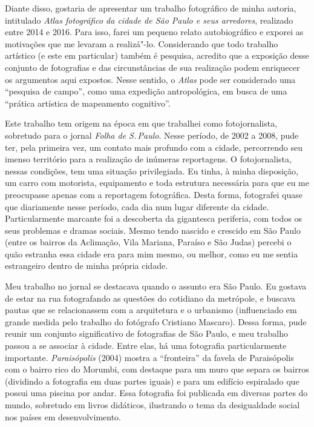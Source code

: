 Diante disso, gostaria de apresentar um trabalho fotográfico de minha
autoria, intitulado \emph{Atlas fotográfico da cidade de São Paulo e
seus arredores}, realizado entre 2014 e 2016. Para isso, farei um
pequeno relato autobiográfico e exporei as motivações que me levaram a
realizá"-lo. Considerando que todo trabalho artístico (e este em
particular) também é pesquisa, acredito que a exposição desse conjunto
de fotografias e das circunstâncias de sua realização podem enriquecer
os argumentos aqui expostos. Nesse sentido, o \emph{Atlas} pode ser
considerado uma ``pesquisa de campo'', como uma expedição antropológica,
em busca de uma ``prática artística de mapeamento cognitivo''.

Este trabalho tem origem na época em que trabalhei como fotojornalista,
sobretudo para o jornal \emph{Folha de S.\,Paulo}. Nesse período, de 2002
a 2008, pude ter, pela primeira vez, um contato mais profundo com a
cidade, percorrendo seu imenso território para a realização de inúmeras
reportagens. O fotojornalista, nessas condições, tem uma situação
privilegiada. Eu tinha, à minha disposição, um carro com motorista,
equipamento e toda estrutura necessária para que eu me preocupasse
apenas com a reportagem fotográfica. Desta forma, fotografei quase que
diariamente nesse período, cada dia num lugar diferente da cidade.
Particularmente marcante foi a descoberta da gigantesca periferia, com todos os seus problemas e dramas sociais. Mesmo tendo
nascido e crescido em São Paulo (entre os bairros da Aclimação, Vila
Mariana, Paraíso e São Judas) percebi o quão estranha essa cidade era
para mim mesmo, ou melhor, como eu me sentia estrangeiro dentro de minha
própria cidade.

Meu trabalho no jornal se destacava quando o assunto era São Paulo. Eu
gostava de estar na rua fotografando as questões do cotidiano da
metrópole, e buscava pautas que se relacionassem com a arquitetura e o
urbanismo (influenciado em grande medida pelo trabalho do fotógrafo
Cristiano Mascaro). Dessa forma, pude reunir um conjunto significativo
de fotografias de São Paulo, e meu trabalho passou a se associar à
cidade. Entre elas, há uma fotografia particularmente importante.
\emph{Paraisópolis} (2004) mostra a ``fronteira'' da favela de
Paraisópolis com o bairro rico do Morumbi, com destaque para um muro que
separa os bairros (dividindo a fotografia em duas partes iguais) e para
um edifício espiralado que possui uma piscina por andar. Essa fotografia
foi publicada em diversas partes do mundo, sobretudo em livros
didáticos, ilustrando o tema da desigualdade social nos países em
desenvolvimento.

